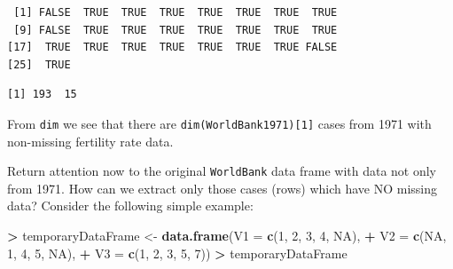 \documentclass[]{krantz}
\makeatletter
\newenvironment{Shaded}{\begin{snugshade}}{\end{snugshade}}
\newcommand{\DataTypeTok}[1]{\textcolor[rgb]{0.27,0.27,0.27}{#1}}
\newcommand{\DecValTok}[1]{\textcolor[rgb]{0.06,0.06,0.06}{#1}}
\newcommand{\KeywordTok}[1]{\textcolor[rgb]{0.27,0.27,0.27}{\textbf{#1}}}
\newcommand{\NormalTok}[1]{#1}
\newcommand{\OperatorTok}[1]{\textcolor[rgb]{0.43,0.43,0.43}{\textbf{#1}}}
\newcommand{\OtherTok}[1]{\textcolor[rgb]{0.37,0.37,0.37}{#1}}
\newcommand{\StringTok}[1]{\textcolor[rgb]{0.5,0.5,0.5}{#1}}
\newenvironment{kframe}{%
\medskip{}
\setlength{\fboxsep}{.8em}
 \def\at@end@of@kframe{}%
 \ifinner\ifhmode%
  \def\at@end@of@kframe{\end{minipage}}%
  \begin{minipage}{\columnwidth}%
 \fi\fi%
 \def\FrameCommand##1{\hskip\@totalleftmargin \hskip-\fboxsep
 \colorbox{shadecolor}{##1}\hskip-\fboxsep
     \hskip-\linewidth \hskip-\@totalleftmargin \hskip\columnwidth}%
 \MakeFramed {\advance\hsize-\width
   \@totalleftmargin\z@ \linewidth\hsize
   \@setminipage}}%
 {\par\unskip\endMakeFramed%
 \at@end@of@kframe}
\renewenvironment{Shaded}{\begin{kframe}}{\end{kframe}}
\makeatother
\begin{document}
\begin{verbatim}
 [1] FALSE  TRUE  TRUE  TRUE  TRUE  TRUE  TRUE  TRUE
 [9] FALSE  TRUE  TRUE  TRUE  TRUE  TRUE  TRUE  TRUE
[17]  TRUE  TRUE  TRUE  TRUE  TRUE  TRUE  TRUE FALSE
[25]  TRUE
\end{verbatim}

\begin{Shaded}
\end{Shaded}

\begin{verbatim}
[1] 193  15
\end{verbatim}

From \texttt{dim} we see that there are \texttt{dim(WorldBank1971){[}1{]}} cases from 1971 with non-missing fertility rate data.

Return attention now to the original \texttt{WorldBank} data frame with data not only from 1971. How can we extract only those cases (rows) which have NO missing data? Consider the following simple example:

\begin{Shaded}
\begin{Highlighting}[]
\OperatorTok{>}\StringTok{ }\NormalTok{temporaryDataFrame <-}\StringTok{ }\KeywordTok{data.frame}\NormalTok{(}\DataTypeTok{V1 =} \KeywordTok{c}\NormalTok{(}\DecValTok{1}\NormalTok{, }\DecValTok{2}\NormalTok{, }\DecValTok{3}\NormalTok{, }\DecValTok{4}\NormalTok{, }\OtherTok{NA}\NormalTok{),}
\OperatorTok{+}\StringTok{                                  }\DataTypeTok{V2 =} \KeywordTok{c}\NormalTok{(}\OtherTok{NA}\NormalTok{, }\DecValTok{1}\NormalTok{, }\DecValTok{4}\NormalTok{, }\DecValTok{5}\NormalTok{, }\OtherTok{NA}\NormalTok{),}
\OperatorTok{+}\StringTok{                                  }\DataTypeTok{V3 =} \KeywordTok{c}\NormalTok{(}\DecValTok{1}\NormalTok{, }\DecValTok{2}\NormalTok{, }\DecValTok{3}\NormalTok{, }\DecValTok{5}\NormalTok{, }\DecValTok{7}\NormalTok{))}
\OperatorTok{>}\StringTok{ }\NormalTok{temporaryDataFrame}
\end{Highlighting}
\end{Shaded}
\end{document}

